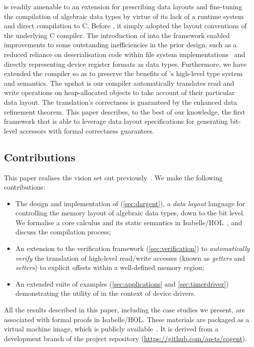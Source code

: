 \cogent is readily amenable to an extension for prescribing 
data layouts and fine-tuning the compilation of algebraic data types 
by virtue of its lack of a runtime system
and direct compilation to C. Before \dargent, it simply adopted
the layout conventions of the
underlying C compiler. The introduction of \dargent into the
framework enabled improvements to
some outstanding inefficiencies in the prior design, such as
a reduced reliance on deserialisation code within file system
implementations~\citep{Amani:2016} and directly representing device
register formats as data types.
Furthermore, we have extended the \cogent compiler so as to preserve the
benefits of \cogent's high-level type system and semantics. The upshot
is our compiler automatically translates read and write operations on
heap-allocated objects to take account of their particular data
layout. The translation's correctness is guaranteed by the enhanced
data refinement theorem. 
This paper describes, to the best of our knowledge, the first framework that
is able to leverage data layout specifications for generating bit-level accessors
with formal correctness guarantees. %

\subsection*{Contributions}
This paper realises the vision set out previously~\citep{Isola:2018}.
We make the following contributions:
\begin{itemize}
  \item The design and implementation of \Dargent
    (\autoref{sec:dargent}), a \emph{data layout} language for
    controlling the memory layout of algebraic data types, down to the
    bit level. We formalise a core calculus and its static semantics
    in Isabelle/HOL~\citep{Nipkow:2002}, and discuss the compilation process;
  \item An extension to the \cogent verification framework 
    (\autoref{sec:verification}) to \emph{automatically verify} the
    translation of high-level read/write accesses (known as
    \emph{getters} and \emph{setters}) to explicit offsets within a
    well-defined memory region;
  \item An extended suite of examples (\autoref{sec:applications}
    and \autoref{sec:timerdriver}) demonstrating the utility of \Dargent in
    the context of device drivers.
\end{itemize}
All the results described in this paper, including the case studies we
present, are associated with formal proofs in Isabelle/HOL.
These materials are packaged as a virtual machine image, which is publicly
available~\citep{dargent-artefact}. It is derived from a development branch of
the \cogent project repository (\url{https://github.com/au-ts/cogent}).

